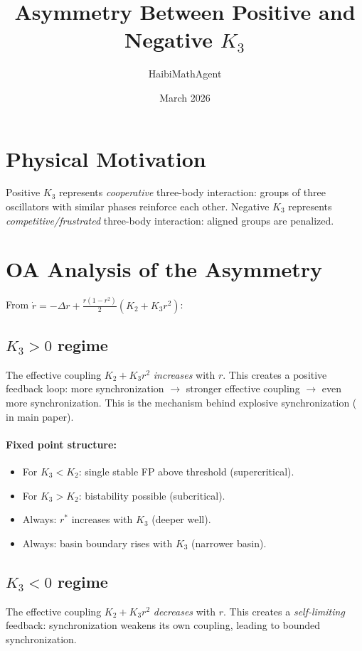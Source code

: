 \documentclass[11pt]{article}
\title{Asymmetry Between Positive and Negative $K_3$}
\author{HaibiMathAgent}
\date{March 2026}
\begin{document}
\maketitle

\section{Physical Motivation}

Positive $K_3$ represents \emph{cooperative} three-body interaction: groups of
three oscillators with similar phases reinforce each other.  Negative $K_3$
represents \emph{competitive/frustrated} three-body interaction: aligned groups
are penalized.

\section{OA Analysis of the Asymmetry}

From $\dot{r} = -\Delta r + \frac{r(1-r^2)}{2}(K_2 + K_3 r^2)$:

\subsection{$K_3 > 0$ regime}
The effective coupling $K_2 + K_3 r^2$ \emph{increases} with $r$.
This creates a positive feedback loop: more synchronization $\to$ stronger
effective coupling $\to$ even more synchronization.  This is the mechanism
behind explosive synchronization ( in main paper).

\paragraph{Fixed point structure:}
\begin{itemize}
  \item For $K_3 < K_2$: single stable FP above threshold (supercritical).
  \item For $K_3 > K_2$: bistability possible (subcritical).
  \item Always: $r^*$ increases with $K_3$ (deeper well).
  \item Always: basin boundary rises with $K_3$ (narrower basin).
\end{itemize}

\subsection{$K_3 < 0$ regime}
The effective coupling $K_2 + K_3 r^2$ \emph{decreases} with $r$.
This creates a \emph{self-limiting} feedback: synchronization weakens
its own coupling, leading to bounded synchronization.
\end{document}
